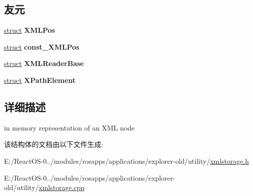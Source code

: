 \subsection*{友元}
\begin{DoxyCompactItemize}
\item 
\mbox{\label{struct_x_m_l_storage_1_1_x_m_l_node_a0857c2ce7d9bd4c06e97ac00f7f58d5b}} 
\hyperlink{interfacestruct}{struct} {\bfseries X\+M\+L\+Pos}
\item 
\mbox{\label{struct_x_m_l_storage_1_1_x_m_l_node_a361c4bfff0f29eecbf7e792404a3da79}} 
\hyperlink{interfacestruct}{struct} {\bfseries const\+\_\+\+X\+M\+L\+Pos}
\item 
\mbox{\label{struct_x_m_l_storage_1_1_x_m_l_node_ad1c5fcadfa66352b324b69b3bba4d96d}} 
\hyperlink{interfacestruct}{struct} {\bfseries X\+M\+L\+Reader\+Base}
\item 
\mbox{\label{struct_x_m_l_storage_1_1_x_m_l_node_a43e8ffc4cafed9614b52d38f9471036c}} 
\hyperlink{interfacestruct}{struct} {\bfseries X\+Path\+Element}
\end{DoxyCompactItemize}


\subsection{详细描述}
in memory representation of an X\+ML node 

该结构体的文档由以下文件生成\+:\begin{DoxyCompactItemize}
\item 
E\+:/\+React\+O\+S-\/0../modules/rosapps/applications/explorer-\/old/utility/\hyperlink{xmlstorage_8h}{xmlstorage.\+h}\item 
E\+:/\+React\+O\+S-\/0../modules/rosapps/applications/explorer-\/old/utility/\hyperlink{xmlstorage_8cpp}{xmlstorage.\+cpp}\end{DoxyCompactItemize}
